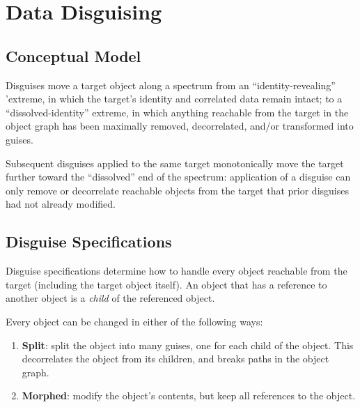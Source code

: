 \section{Data Disguising}
\subsection{Conceptual Model}

%
Disguises move a target object along a spectrum from an ``identity-revealing'' 'extreme, in which the target's identity
and correlated data remain intact; to a ``dissolved-identity'' extreme, in which anything reachable from the target
in the object graph has been maximally removed, decorrelated, and/or transformed into guises.

Subsequent disguises applied to the same target monotonically move the target further
toward the ``dissolved'' end of the spectrum: application of a disguise can only 
remove or decorrelate reachable objects from the target that prior disguises had not
already modified.

\subsection{Disguise Specifications}

Disguise specifications determine how to handle every object reachable from the target (including the target
object itself).  
An object that has a reference to another object is a \emph{child} of the referenced object.

Every object can be changed in either of the following ways:
\begin{enumerate}
    \item \textbf{Split}: split the object into many guises, one for each child of the object.
        This decorrelates the object from its children, and breaks paths in the object graph.
    \item \textbf{Morphed}: modify the object's contents, but keep all references to the object.
\end{enumerate}

